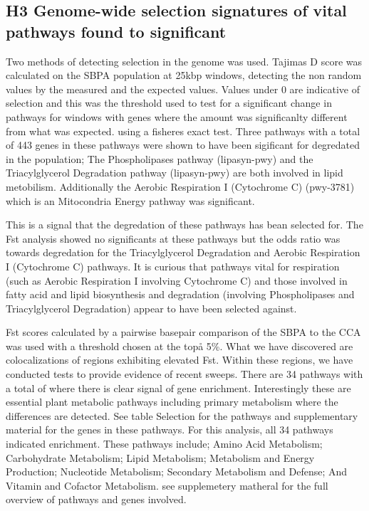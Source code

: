 \documentclass[9pt, twocolumn,twoside]{gsajnl}
\begin{document}
\subsection{H3 Genome-wide selection signatures of vital pathways found to significant} 

Two methods of detecting selection in the genome was used. Tajimas D score was calculated on the SBPA population at 25kbp windows, detecting the non random values by  the measured and the expected values. Values under 0 are indicative of selection and this was the threshold used to test for a significant change in pathways for windows with genes where the amount was significanlty different from what was expected. using a fisheres exact test. Three pathways with a total of 443 genes in these pathways were shown to have been sigificant for degredated in the population; The Phospholipases pathway (lipasyn-pwy) and the Triacylglycerol Degradation pathway (lipasyn-pwy) are both involved in lipid metobilism.  Additionally the Aerobic Respiration I (Cytochrome C) (pwy-3781) which is an Mitocondria Energy pathway was significant. 

This is a signal that the degredation of these pathways has bean selected for. The Fst analysis showed no significants at these pathways but the odds ratio was towards degredation for the Triacylglycerol Degradation and Aerobic Respiration I (Cytochrome C) pathways. It is curious that pathways vital for respiration (such as Aerobic Respiration I involving Cytochrome C) and those involved in fatty acid and lipid biosynthesis and degradation (involving Phospholipases and Triacylglycerol Degradation) appear to have been selected against.
 
Fst scores calculated by a pairwise basepair comparison of the SBPA to the CCA was used with a threshold chosen at the topå 5\%. What we have discovered are colocalizations of regions exhibiting elevated Fst. Within these regions, we have conducted tests to provide evidence of recent sweeps. There are 34 pathways with a total of  where there is clear signal of gene enrichment. Interestingly these are essential plant metabolic pathways including primary metabolism where the differences are detected. See table Selection for the pathways and supplementary material for the genes in these pathways. For this analysis, all 34 pathways indicated enrichment. 
These pathways include; Amino Acid Metabolism; Carbohydrate Metabolism; Lipid Metabolism; Metabolism and Energy Production; Nucleotide Metabolism; Secondary Metabolism and Defense; And Vitamin and Cofactor Metabolism. see supplemetery matheral for the full overview of pathways and genes involved. 
\end{document}
